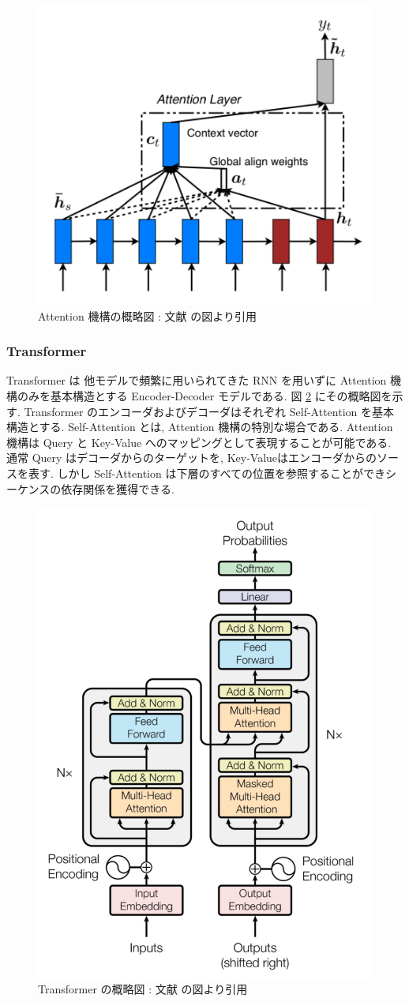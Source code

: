\begin{figure}[!h]
  \centering
  \includegraphics[width=0.6\hsize]{doc/figures/attention.png}
  \caption{Attention 機構の概略図 : 文献 \cite{attention} の図より引用}
  \label{fig:attention}
\end{figure}

\newpage
\changeindent{0cm}
\subsubsection{Transformer}
\changeindent{2cm}

Transformer \cite{transformer} は 他モデルで頻繁に用いられてきた RNN を用いずに
Attention 機構のみを基本構造とする Encoder-Decoder モデルである.
図 \ref{fig:transformer} にその概略図を示す.
Transformer のエンコーダおよびデコーダはそれぞれ Self-Attention を基本構造とする. Self-Attention とは, Attention 機構の特別な場合である.
Attention 機構は Query と Key-Value へのマッピングとして表現することが可能である.
通常 Query はデコーダからのターゲットを, Key-Valueはエンコーダからのソースを表す.
しかし Self-Attention は下層のすべての位置を参照することができシーケンスの依存関係を獲得できる.

\begin{figure}[!h]
  \centering
  \includegraphics[width=0.5\hsize]{doc/figures/transformer.png}
  \caption{Transformer の概略図 : 文献 \cite{transformer} の図より引用}
  \label{fig:transformer}
\end{figure}

